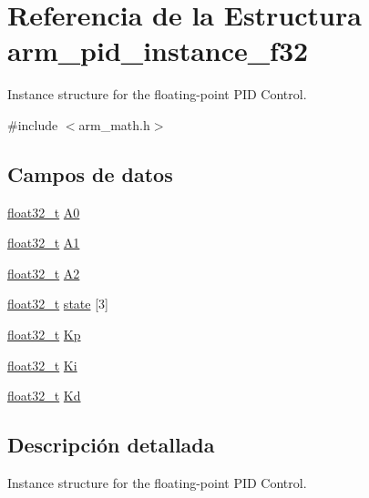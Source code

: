 \hypertarget{structarm__pid__instance__f32}{}\section{Referencia de la Estructura arm\+\_\+pid\+\_\+instance\+\_\+f32}
\label{structarm__pid__instance__f32}


Instance structure for the floating-\/point P\+ID Control.  




{\ttfamily \#include $<$arm\+\_\+math.\+h$>$}

\subsection*{Campos de datos}
\begin{DoxyCompactItemize}
\item 
\hyperlink{arm__math_8h_a4611b605e45ab401f02cab15c5e38715}{float32\+\_\+t} \hyperlink{structarm__pid__instance__f32_afc2ed2bf70b7d9d84f49ee9ae7caa004}{A0}
\item 
\hyperlink{arm__math_8h_a4611b605e45ab401f02cab15c5e38715}{float32\+\_\+t} \hyperlink{structarm__pid__instance__f32_a5e6785a3a5cf7b98f3bfc7b180d98273}{A1}
\item 
\hyperlink{arm__math_8h_a4611b605e45ab401f02cab15c5e38715}{float32\+\_\+t} \hyperlink{structarm__pid__instance__f32_a5b00947275caf079f351271bf41573fe}{A2}
\item 
\hyperlink{arm__math_8h_a4611b605e45ab401f02cab15c5e38715}{float32\+\_\+t} \hyperlink{structarm__pid__instance__f32_a473556ac6100fc188e77930d56f51062}{state} \mbox{[}3\mbox{]}
\item 
\hyperlink{arm__math_8h_a4611b605e45ab401f02cab15c5e38715}{float32\+\_\+t} \hyperlink{structarm__pid__instance__f32_abe23f3e122ef5f55398fcf77c793c425}{Kp}
\item 
\hyperlink{arm__math_8h_a4611b605e45ab401f02cab15c5e38715}{float32\+\_\+t} \hyperlink{structarm__pid__instance__f32_ad1a1aa1c10a2dca201a3422f82198777}{Ki}
\item 
\hyperlink{arm__math_8h_a4611b605e45ab401f02cab15c5e38715}{float32\+\_\+t} \hyperlink{structarm__pid__instance__f32_ace6b9e405a991cbaf6b4c137ca0d51a3}{Kd}
\end{DoxyCompactItemize}


\subsection{Descripción detallada}
Instance structure for the floating-\/point P\+ID Control. 


